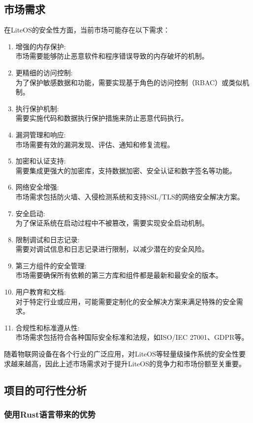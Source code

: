 \documentclass{ctexart}
\begin{document}
\subsection{市场需求}
在LiteOS的安全性方面，当前市场可能存在以下需求：
\begin{enumerate}
\item 增强的内存保护:\\
市场需要能够防止恶意软件和程序错误导致的内存破坏的机制。
\item 更精细的访问控制:\\
为了保护敏感数据和功能，需要实现基于角色的访问控制（RBAC）或类似机制。
\item 执行保护机制:\\
需要实施代码和数据执行保护措施来防止恶意代码执行。
\item 漏洞管理和响应:\\
市场需要有效的漏洞发现、评估、通知和修复流程。
\item 加密和认证支持:\\
需要集成更强大的加密库，支持数据加密、安全认证和数字签名等功能。
\item 网络安全增强:\\
市场需求包括防火墙、入侵检测系统和支持SSL/TLS的网络安全解决方案。
\item 安全启动:\\
为了保证系统在启动过程中不被篡改，需要实现安全启动机制。
\item 限制调试和日志记录:\\
需要对调试信息和日志记录进行限制，以减少潜在的安全风险。
\item 第三方组件的安全管理:\\
市场需要确保所有依赖的第三方库和组件都是最新和最安全的版本。
\item 用户教育和文档:\\
对于特定行业或应用，可能需要定制化的安全解决方案来满足特殊的安全需求。
\item 合规性和标准遵从性:\\
市场需求包括符合各种国际安全标准和法规，如ISO/IEC 27001、GDPR等。
\end{enumerate}
随着物联网设备在各个行业的广泛应用，对LiteOS等轻量级操作系统的安全性要求越来越高，因此上述市场需求对于提升LiteOS的竞争力和市场份额至关重要。
\subsection{项目的可行性分析}
\subsubsection{使用Rust语言带来的优势}
\end{document}
